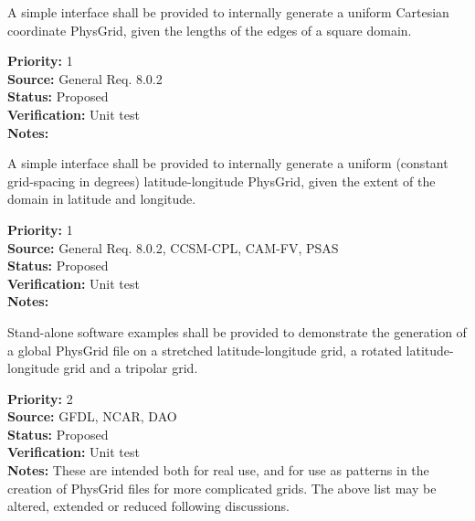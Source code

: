 A simple interface shall be provided to internally generate a uniform Cartesian
coordinate PhysGrid, given the lengths of the edges of a square domain.
\begin{reqlist}
{\bf Priority:} 1 \\
{\bf Source:} General Req. 8.0.2 \\
{\bf Status:} Proposed \\
{\bf Verification:} Unit test\\
{\bf Notes:} 
\end{reqlist}

A simple interface shall be provided to internally generate a uniform (constant
grid-spacing in degrees) latitude-longitude PhysGrid, given the extent of the domain
in latitude and longitude.                                                           
\begin{reqlist}
{\bf Priority:} 1 \\
{\bf Source:} General Req. 8.0.2, CCSM-CPL, 
CAM-FV, PSAS \\
{\bf Status:} Proposed \\
{\bf Verification:} Unit test\\
{\bf Notes:} 
\end{reqlist}

Stand-alone software examples shall be provided to demonstrate the generation of a
global PhysGrid file on a stretched latitude-longitude grid, a rotated
latitude-longitude grid and a tripolar grid. 
\begin{reqlist}
{\bf Priority:} 2 \\
{\bf Source:} GFDL, NCAR, 
DAO \\
{\bf Status:} Proposed \\
{\bf Verification:} Unit test\\
{\bf Notes:} These are intended both for real use, and for use as patterns in the
creation of PhysGrid files for more complicated grids.  The above list may be
altered, extended or reduced following discussions.
\end{reqlist}


